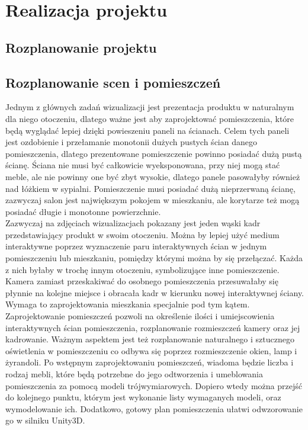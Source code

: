 \documentclass{article} %
\begin{document}
        
\section{Realizacja projektu}
    \subsection{Rozplanowanie projektu}
    
    
    \subsection{Rozplanowanie scen i pomieszczeń}
        Jednym z głównych zadań wizualizacji jest prezentacja produktu w naturalnym dla niego otoczeniu, dlatego ważne jest aby zaprojektować pomieszczenia, które będą wyglądać lepiej dzięki powieszeniu paneli na ścianach. Celem tych paneli jest ozdobienie i przełamanie monotonii dużych pustych ścian danego pomieszczenia, dlatego prezentowane pomieszczenie powinno posiadać dużą pustą ścianę. Ściana nie musi być całkowicie wyeksponowana, przy niej mogą stać meble, ale nie powinny one być zbyt wysokie, dlatego panele pasowałyby również nad łóżkiem w sypialni. Pomieszczenie musi posiadać dużą nieprzerwaną ścianę, zazwyczaj salon jest największym pokojem w mieszkaniu, ale korytarze też mogą posiadać długie i monotonne powierzchnie.
        \\
        
        Zazwyczaj na zdjęciach wizualizacjach pokazany jest jeden wąski kadr przedstawiający produkt w swoim otoczeniu. Można by lepiej użyć medium interaktywne poprzez wyznaczenie paru interaktywnych ścian w jednym pomieszczeniu lub mieszkaniu, pomiędzy którymi można by się przełączać. Każda z nich byłaby w trochę innym otoczeniu, symbolizujące inne pomieszczenie. Kamera zamiast przeskakiwać do osobnego pomieszczenia przesuwałaby się płynnie na kolejne miejsce i obracała kadr w kierunku nowej interaktywnej ściany. Wymaga to zaprojektowania mieszkania specjalnie pod tym kątem.
        \\
        
        Zaprojektowanie pomieszczeń pozwoli na określenie ilości i umiejscowienia interaktywnych ścian pomieszczenia, rozplanowanie rozmieszczeń kamery oraz jej kadrowanie. Ważnym aspektem jest też rozplanowanie naturalnego i sztucznego oświetlenia w pomieszczeniu co odbywa się poprzez rozmieszczenie okien, lamp i żyrandoli. Po wstępnym zaprojektowaniu pomieszczeń, wiadoma będzie liczba i rodzaj mebli, które będą potrzebne do jego odtworzenia i umeblowania pomieszczenia za pomocą modeli trójwymiarowych. Dopiero wtedy można przejść do kolejnego punktu, którym jest wykonanie listy wymaganych modeli, oraz wymodelowanie ich. Dodatkowo, gotowy plan pomieszczenia ułatwi odwzorowanie go w silniku Unity3D.
        \\
        
\end{document}
